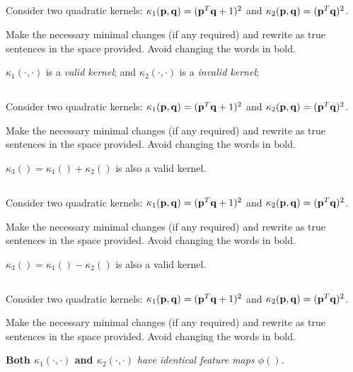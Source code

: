 \begin{frame}
\section{}
Consider two quadratic kernels:  $\kappa_1({\bf p}, {\bf q}) = ({\bf p}^T{\bf q}+1)^2$ and $\kappa_2({\bf p}, {\bf q}) = ({\bf p}^T{\bf q})^2$.

Make the necessary minimal changes  (if any required) and rewrite as true sentences in the space provided. Avoid changing the words in bold.

{\bf $\kappa_1(\cdot, \cdot)$} is a {\em valid kernel}; and {\bf $\kappa_2(\cdot, \cdot)$} is a {\em invalid kernel};


\end{frame}

\begin{frame}
\section{}
Consider two quadratic kernels:  $\kappa_1({\bf p}, {\bf q}) = ({\bf p}^T{\bf q}+1)^2$ and $\kappa_2({\bf p}, {\bf q}) = ({\bf p}^T{\bf q})^2$.

Make the necessary minimal changes  (if any required) and rewrite as true sentences in the space provided. Avoid changing the words in bold.

$\kappa_3() = \kappa_1() + \kappa_2()$ is also a valid kernel.


\end{frame}

\begin{frame}
\section{}
Consider two quadratic kernels:  $\kappa_1({\bf p}, {\bf q}) = ({\bf p}^T{\bf q}+1)^2$ and $\kappa_2({\bf p}, {\bf q}) = ({\bf p}^T{\bf q})^2$.

Make the necessary minimal changes  (if any required) and rewrite as true sentences in the space provided. Avoid changing the words in bold.

$\kappa_3() = \kappa_1() - \kappa_2()$ is also a valid kernel.


\end{frame}

\begin{frame}
\section{}
Consider two quadratic kernels:  $\kappa_1({\bf p}, {\bf q}) = ({\bf p}^T{\bf q}+1)^2$ and $\kappa_2({\bf p}, {\bf q}) = ({\bf p}^T{\bf q})^2$.

Make the necessary minimal changes  (if any required) and rewrite as true sentences in the space provided. Avoid changing the words in bold.


{\bf Both $\kappa_1(\cdot, \cdot)$ and $\kappa_2(\cdot, \cdot)$} {\em have identical feature maps $\phi()$.}


\end{frame}

